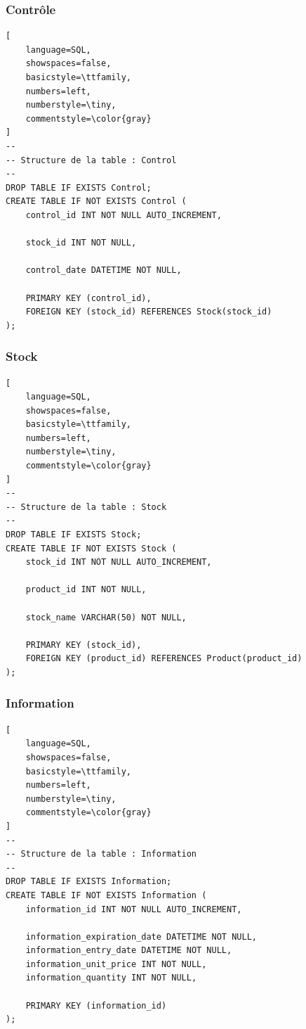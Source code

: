 \subsubsection*{Contrôle}
\begin{lstlisting}[
    language=SQL,
    showspaces=false,
    basicstyle=\ttfamily,
    numbers=left,
    numberstyle=\tiny,
    commentstyle=\color{gray}
]
--
-- Structure de la table : Control
--
DROP TABLE IF EXISTS Control;
CREATE TABLE IF NOT EXISTS Control (
    control_id INT NOT NULL AUTO_INCREMENT,

    stock_id INT NOT NULL,

    control_date DATETIME NOT NULL,

    PRIMARY KEY (control_id),
    FOREIGN KEY (stock_id) REFERENCES Stock(stock_id)
);
\end{lstlisting}

\subsubsection*{Stock}
\begin{lstlisting}[
    language=SQL,
    showspaces=false,
    basicstyle=\ttfamily,
    numbers=left,
    numberstyle=\tiny,
    commentstyle=\color{gray}
]
--
-- Structure de la table : Stock
--
DROP TABLE IF EXISTS Stock;
CREATE TABLE IF NOT EXISTS Stock (
    stock_id INT NOT NULL AUTO_INCREMENT,

    product_id INT NOT NULL,

    stock_name VARCHAR(50) NOT NULL,

    PRIMARY KEY (stock_id),
    FOREIGN KEY (product_id) REFERENCES Product(product_id)
);
\end{lstlisting}

\subsubsection*{Information}
\begin{lstlisting}[
    language=SQL,
    showspaces=false,
    basicstyle=\ttfamily,
    numbers=left,
    numberstyle=\tiny,
    commentstyle=\color{gray}
]
--
-- Structure de la table : Information
--
DROP TABLE IF EXISTS Information;
CREATE TABLE IF NOT EXISTS Information (
    information_id INT NOT NULL AUTO_INCREMENT,

    information_expiration_date DATETIME NOT NULL,
    information_entry_date DATETIME NOT NULL,
    information_unit_price INT NOT NULL,
    information_quantity INT NOT NULL,

    PRIMARY KEY (information_id)
);
\end{lstlisting}

